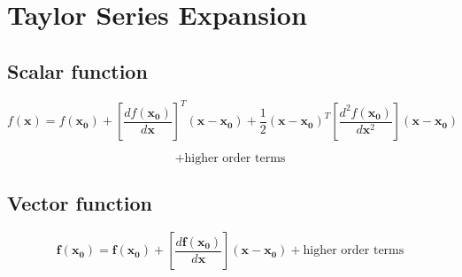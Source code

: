 \documentclass[fleqn]{article}
\begin{document}
	\section{Taylor Series Expansion}
	
	\subsection{Scalar function}
	
	\begin{equation*}
		f(\mathbf{x}) = f(\mathbf{x_0}) + \left[\frac{df(\mathbf{x_0})}{d\mathbf{x}}\right]^T(\mathbf{x} - \mathbf{x_0}) + \frac{1}{2}(\mathbf{x}-\mathbf{x_0})^T\left[\frac{d^2f(\mathbf{x_0})}{d\mathbf{x}^2}\right](\mathbf{x} - \mathbf{x_0}) 
	\end{equation*}
	
	\begin{equation*}
		+ \text{higher order terms}
	\end{equation*}
	
	\subsection{Vector function}
	
	\begin{equation*}
		\mathbf{f}(\mathbf{x_0}) = \mathbf{f}(\mathbf{x_0}) + \left[\frac{d\mathbf{f}(\mathbf{x_0})}{d\mathbf{x}}\right](\mathbf{x} - \mathbf{x_0}) + \text{higher order terms}
	\end{equation*}
\end{document}
